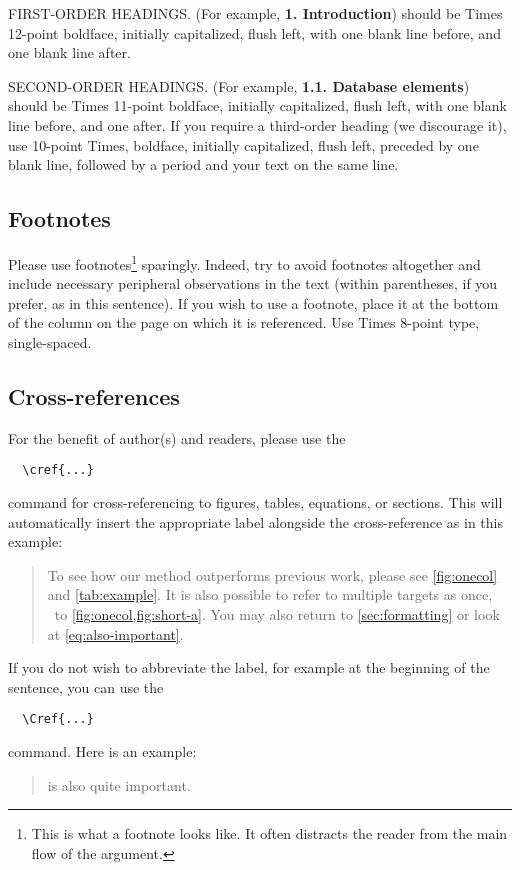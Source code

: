 \documentclass[10pt,twocolumn,letterpaper]{article}
\begin{document}
    FIRST-ORDER HEADINGS.
    (For example, {\large \bf 1. Introduction}) should be Times 12-point boldface, initially capitalized, flush left, with one blank line before, and one blank line after.

    SECOND-ORDER HEADINGS.
    (For example, { \bf 1.1. Database elements}) should be Times 11-point boldface, initially capitalized, flush left, with one blank line before, and one after.
    If you require a third-order heading (we discourage it), use 10-point Times, boldface, initially capitalized, flush left, preceded by one blank line, followed by a period and your text on the same line.


    \subsection{Footnotes}

    Please use footnotes\footnote{This is what a footnote looks like.
    It often distracts the reader from the main flow of the argument.} sparingly.
    Indeed, try to avoid footnotes altogether and include necessary peripheral observations in the text (within parentheses, if you prefer, as in this sentence).
    If you wish to use a footnote, place it at the bottom of the column on the page on which it is referenced.
    Use Times 8-point type, single-spaced.



    \subsection{Cross-references}

    For the benefit of author(s) and readers, please use the
        {\small\begin{verbatim}
  \cref{...}
    \end{verbatim}}  command for cross-referencing to figures, tables, equations, or sections.
    This will automatically insert the appropriate label alongside the cross-reference as in this example:
    \begin{quotation}
        To see how our method outperforms previous work, please see \cref{fig:onecol} and \cref{tab:example}.
        It is also possible to refer to multiple targets as once, \eg~to \cref{fig:onecol,fig:short-a}.
        You may also return to \cref{sec:formatting} or look at \cref{eq:also-important}.
    \end{quotation}
    If you do not wish to abbreviate the label, for example at the beginning of the sentence, you can use the
        {\small\begin{verbatim}
  \Cref{...}
    \end{verbatim}}
    command. Here is an example:
    \begin{quotation}
         is also quite important.
    \end{quotation}
\end{document}
